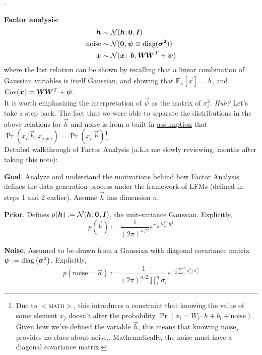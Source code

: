 \documentclass[11pt]{article}
\begin{document}
\myspace
\p {}.
\begin{compactitem}
	\item \textbf{Factor analysis}: 
	\begin{align}
		\bm{h}_{} &\sim \mathcal{N}(\bm{h}_{}; \bm{0}_{}, \bm{I}_{}) \\
		\text{noise} &\sim \mathcal{N}(\bm{0}_{}, \bm{\psi}_{}\equiv\text{diag}(\bm{\sigma^2}_{})) \\
		\bm{x}_{} &\sim \mathcal{N}(\bm{x}_{};~ \bm{b}_{}, \bm{W}_{}\bm{W}_{}^T + \bm{\psi}_{})
	\end{align}
	where the last relation can be shown by recalling that a linear combination of Gaussian variables is itself Gaussian, and showing that $\mathbb{E}_h\left[\vec{x}\right] = \vec{b}$, and $\text{Cov}(\bm{x}_{}) = \bm{W}_{}\bm{W}_{}^T + \bm{\psi}_{}$. \\
	
	\p It is worth emphasizing the interpretation of $\vec{\psi}$ as the matrix of  $\sigma_i^2$. \textit{Huh?} Let's take a step back. The fact that we were able to separate the distributions in the above relations for $\vec{h}$ and $\text{noise}$ is from a built-in \underline{assumption} that $\Pr(x_i | \vec{h}, x_{j \ne i}) = \Pr(x_i | \vec{h})$\footnote{Due to $<$\textsc{math}$>$, this introduces a constraint that knowing the value of some element $x_j$ doesn't alter the probability $\Pr(x_i = W_i \cdot h + b_i + \text{noise})$. Given how we've defined the variable $\vec{h}$, this means that knowing $\text{noise}_j$ provides no clues about $\text{noise}_i$. Mathematically, the noise must have a diagonal covariance matrix.}. \\
	
	\vspace{0.3em}
	Detailed walkthrough of Factor Analysis (a.k.a me slowly reviewing, months after taking this note):
	{\small
	\begin{compactitem}
		\item \textbf{Goal}. Analyze and understand the motivations behind how Factor Analysis defines the data-generation process under the framework of LFMs (defined in steps 1 and 2 earlier). Assume $\vec{h}$ has dimension $n$. 
		\item \textbf{Prior}. Defines $p(\bm{h}_{}) := \mathcal{N}(\bm{h}_{}; \bm{0}_{}, \bm{I}_{})$, the unit-variance Gaussian. Explicitly,
			$$
				p(\vec{h}) := \frac{1}{(2\pi)^{n/2}} e^{-\frac{1}{2} \sum_i^n h_i^2}
			$$
		\item \textbf{Noise}. Assumed to be drawn from a Gaussian with diagonal covariance matrix $\bm{\psi}_{} := \mathrm{diag}\left(\bm{\sigma}_{}^2\right)$. Explicitly,
		$$
			p(\text{noise} = \vec{a}) := \frac{1}{ (2\pi)^{n / 2} \prod_i^n \sigma_i } e^{-\frac{1}{2} \sum_i^n a_i^2 / \sigma_i^2}
		$$
		

\end{compactitem}}
\end{compactitem}
\end{document}
